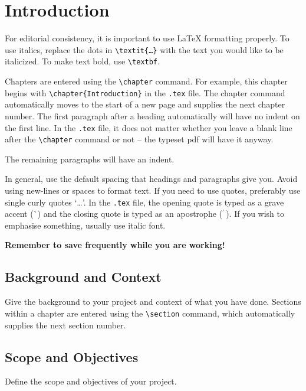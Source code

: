 \documentclass[11pt]{report}
\newcommand{\cmd}[1]{\texttt{\textbackslash{}#1}}
\begin{document}
\begingroup
\singlespacing
\tableofcontents
\endgroup

\begingroup
\singlespacing
\listoffigures
\endgroup

\chapter{Introduction}
For editorial consistency, it is important to use \LaTeX{} formatting properly. To use italics, replace the dots in \cmd{textit\{\ldots\}} with the text you would like to be italicized. To make text bold, use \cmd{textbf}.

Chapters are entered using the \cmd{chapter} command. For example, this chapter begins with \cmd{chapter\{Introduction\}} in the \texttt{.tex} file. The chapter command automatically moves to the start of a new page and supplies the next chapter number. The first paragraph after a heading automatically will have no indent on the first line. In the \texttt{.tex} file, it does not matter whether you leave a blank line after the \cmd{chapter} command or not -- the typeset pdf will have it anyway.

The remaining paragraphs will have an indent.

In general, use the default spacing that headings and paragraphs give you. Avoid using new-lines or spaces to format text. If you need to use quotes, preferably use single curly quotes `\ldots'. In the \texttt{.tex} file, the opening quote is typed as a grave accent (\`{}) and the closing quote is typed as an apostrophe ($^\prime\,$). If you wish to emphasise something, usually use italic font.

\textbf{Remember to save frequently while you are working!}

\section{Background and Context}

Give the background to your project and context of what you have done. Sections within a chapter are entered using the \cmd{section} command, which automatically supplies the next section number.

\section{Scope and Objectives} \label{objectives sec}
Define the scope and objectives of your project.
\end{document}
